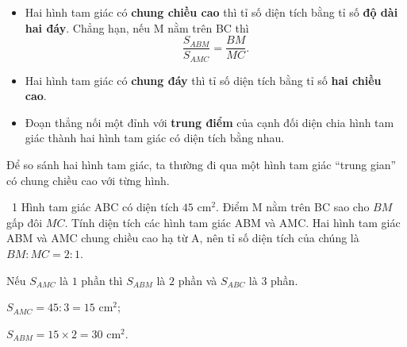 \begin{knowbox}
\begin{minipage}[t]{0.6\linewidth}
\begin{itemize}[leftmargin=1.4em,itemsep=3pt]
\item Hai hình tam giác có \textbf{chung chiều cao} thì tỉ số diện tích bằng tỉ số \textbf{độ dài hai đáy}. Chẳng hạn, nếu M nằm trên BC thì
\[\frac{S_{ABM}}{S_{AMC}}=\frac{BM}{MC}.\]
\item Hai hình tam giác có \textbf{chung đáy} thì tỉ số diện tích bằng tỉ số \textbf{hai chiều cao}.
\item Đoạn thẳng nối một đỉnh với \textbf{trung điểm} của cạnh đối diện chia hình tam giác thành hai hình tam giác có diện tích bằng nhau.
\end{itemize}
Để so sánh hai hình tam giác, ta thường đi qua một hình tam giác ``trung gian'' có chung chiều cao với từng hình.
\end{minipage}\hfill
\begin{minipage}[t]{0.36\linewidth}\vspace{4pt}\centering
{}
\end{minipage}
\end{knowbox}
\gap
\begin{exbox}{\ExWord\ 1}
Hình tam giác ABC có diện tích $45$ cm$^2$. Điểm M nằm trên BC sao cho $BM$ gấp đôi $MC$. Tính diện tích các hình tam giác ABM và AMC.
\guide
Hai hình tam giác ABM và AMC chung chiều cao hạ từ A, nên tỉ số diện tích của chúng là $BM:MC=2:1$.\par Nếu $S_{AMC}$ là $1$ phần thì $S_{ABM}$ là $2$ phần và $S_{ABC}$ là $3$ phần.\par
$S_{AMC}=45:3=15$ cm$^2$;\par $S_{ABM}=15\times2=30$ cm$^2$.
\end{exbox}
\gap

